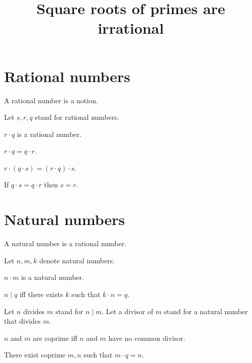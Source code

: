 \documentclass{article}
\title{Square roots of primes are irrational}
\author{}
\date{}
\begin{document}
  \maketitle

  \section*{Rational numbers}

  \begin{forthel}

    \begin{signature}
      A rational number is a notion.
    \end{signature}

    Let $s,r,q$ stand for rational numbers.

    \begin{signature}
      $r \cdot q$ is a rational number.
    \end{signature}

    \begin{axiom}
      $r \cdot q = q \cdot r$.
    \end{axiom}

    \begin{axiom}
      $r \cdot (q \cdot s) = (r \cdot q) \cdot s$.
    \end{axiom}

    \begin{axiom}
      If $q \cdot s = q \cdot r$ then $s = r$.
    \end{axiom}
  \end{forthel}

  \section*{Natural numbers}

  \begin{forthel}
    \begin{signature}
      A natural number is a rational number.
    \end{signature}

    Let $n,m,k$ denote natural numbers.

    \begin{axiom}
      $n \cdot m$ is a natural number.
    \end{axiom}

    \begin{definition}
      $n \mid q$ iff there exists $k$ such that $k \cdot n = q$.
    \end{definition}

    Let $n$ divides $m$ stand for $n \mid m$. Let a divisor of $m$ stand for a natural number that divides $m$.

    \begin{definition}
      $n$ and $m$ are coprime iff $n$ and $m$ have no common divisor.
    \end{definition}

    \begin{axiom}
      There exist coprime $m,n$ such that $m \cdot q = n$.
    \end{axiom}
  \end{forthel}
\end{document}
